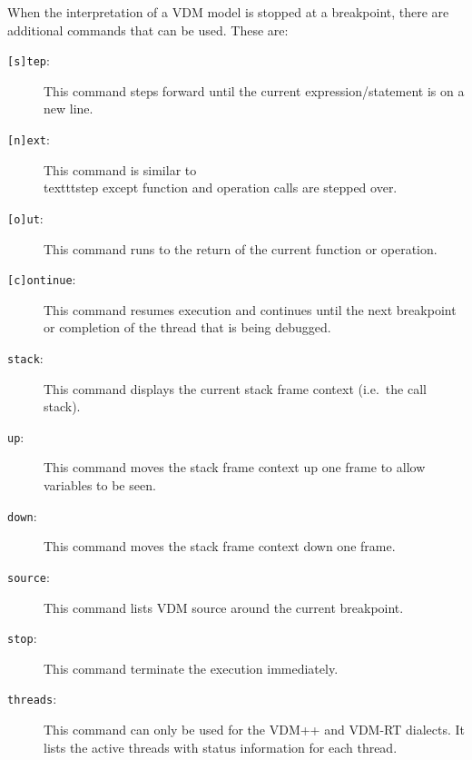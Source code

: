 \documentclass{overturerepchap}
\begin{document}


When the interpretation of a VDM model is stopped at a
breakpoint, there are additional commands that can be used. These are:

\begin{description}
\item[\texttt{[s]tep}:] This command steps forward until the
  current expression/statement is on a new line. 
\item[\texttt{[n]ext}:] This command is similar to \\texttt{step} except
 function and operation calls are stepped over.  
\item[\texttt{[o]ut}:] This command runs to the return of the current
  function or operation.  
\item[\texttt{[c]ontinue}:] This command resumes execution and continues
  until the next breakpoint or completion of the thread that is being
  debugged. 
\item[\texttt{stack}:] This command displays the current stack frame
  context (i.e.\ the call stack). 
\item[\texttt{up}:] This command moves the stack frame context up one
  frame to allow variables to be seen.  
\item[\texttt{down}:] This command moves the stack frame context down
  one frame.  
\item[\texttt{source}:] This command lists VDM source around the
  current breakpoint.  
\item[\texttt{stop}:] This command terminate the execution
  immediately.  
\item[\texttt{threads}:] This command can only be used for the VDM++
  and VDM-RT dialects. It lists the active threads with status
  information for each thread. 
\end{description}
\end{document}
